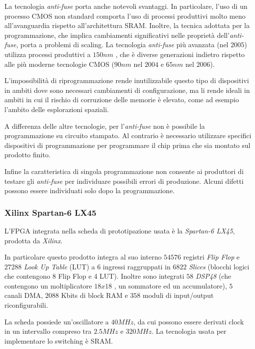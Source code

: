 La tecnologia \textit{anti-fuse} porta anche notevoli svantaggi. In particolare, l'uso di un processo CMOS non standard comporta l'uso di processi produttivi molto meno all'avanguardia rispetto all'architettura SRAM. Inoltre, la tecnica adottata per la programmazione, che implica cambiamenti significativi nelle proprietà dell'\textit{anti-fuse}, porta a problemi di scaling. La tecnologia \textit{anti-fuse} più avanzata (nel $2005$) utilizza processi produttivi a $150nm$ \cite{axfpga}, che è diverse generazioni indietro rispetto alle più moderne tecnologie CMOS ($90nm$ nel $2004$ e $65nm$ nel $2006$).

L'impossibilità di riprogrammazione rende inutilizzabile questo tipo di dispositivi in ambiti dove sono necessari cambiamenti di configurazione, ma li rende ideali in ambiti in cui il rischio di corruzione delle memorie è elevato, come ad esempio l'ambito delle esplorazioni spaziali.

A differenza delle altre tecnologie, per l'\textit{anti-fuse} non è possibile la programmazione su circuito stampato. Al contrario è necessario utilizzare specifici dispositivi di programmazione per programmare il chip prima che sia montato sul prodotto finito.

Infine la caratteristica di singola programmazione non consente ai produttori di testare gli \textit{anti-fuse} per individuare possibili errori di produzione. Alcuni difetti possono essere individuati solo dopo la programmazione.

\subsubsection{Xilinx Spartan-6 LX45}
L'FPGA integrata nella scheda di prototipazione usata è la \textit{Spartan-6 LX45}, prodotta da \textit{Xilinx}.

In particolare questo prodotto integra al suo interno $54576$ registri \textit{Flip Flop} e 27288 \textit{Look Up Table} (LUT) a 6 ingressi raggruppati in $6822$ \textit{Slices} (blocchi logici che contengono 8 Flip Flop e 4 LUT). Inoltre sono integrati $58$ \textit{DSP48} (che contengono un moltiplicatore $18x18$ , un sommatore ed un accumulatore), $5$ canali DMA, $2088$ Kbits di block RAM e $358$ moduli di input/output riconfigurabili. 

La scheda possiede un'oscillatore a $40MHz$, da cui possono essere derivati clock in un intervallo compreso tra $2.5MHz$ e $320MHz$. La tecnologia usata per implementare lo switching è SRAM. 


